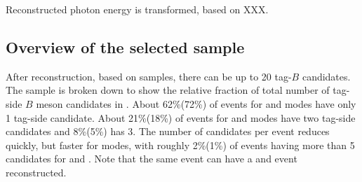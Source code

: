 Reconstructed photon energy is transformed, based on XXX.

\subsection{Overview of the selected sample}\label{sec:reconstruction_overview}

After reconstruction, based on \MC samples, there can be up to 20 tag-$B$ candidates.
The sample is broken down to show the relative fraction of total number of tag-side $B$ meson candidates in 
.
About 62\%(72\%) of events for \Bp and \Bz \FEI modes have only 1 tag-side candidate.
About 21\%(18\%) of events for \Bp and \Bz \FEI modes have two tag-side candidates and 8\%(5\%) has 3.
The number of candidates per event reduces quickly, but faster for \Bz modes, with roughly 2\%(1\%) 
of events having more than 5 candidates for \Bp and \Bz.
Note that the same event can have a \Bp and \Bz event reconstructed.

